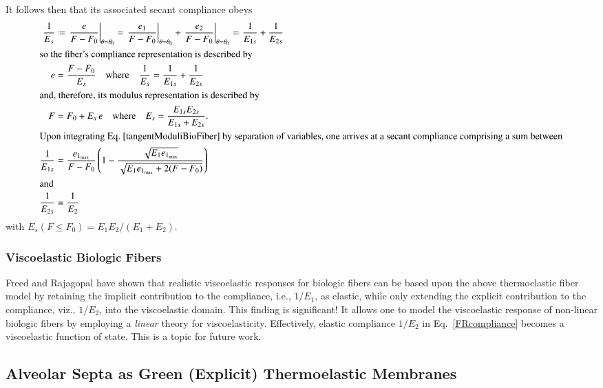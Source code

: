 It follows then that its associated secant compliance obeys
\begin{subequations}
    \label{secantFiberModulus}
    \begin{align}
    \frac{1}{E_s} & \defeq 
    \left. \frac{e}{F-F_0} \right|_{\theta = \theta_0} = 
    \left. \frac{e_1}{F-F_0} \right|_{\theta = \theta_0} + 
    \left. \frac{e_2}{F-F_0} \right|_{\theta = \theta_0} \eqdef 
    \frac{1}{E_{1s}} + \frac{1}{E_{2s}} \\
    \intertext{so the fiber's compliance representation is described by}
    e & = \frac{F - F_0}{E_s} 
    \quad \text{where} \quad
    \frac{1}{E_s} = \frac{1}{E_{1s}} + \frac{1}{E_{2s}} \\
    \intertext{and, therefore, its modulus representation is described by}
    F & = F_0 + E_s \, e
    \quad \text{where} \quad
    E_s = \frac{E_{1s} E_{2s}}{E_{1s} + E_{2s}} . \\
    \intertext{Upon integrating Eq.~\ref{tangentModuliBioFiber} by separation of variables, one arrives at a secant compliance comprising a sum between}
    \frac{1}{E_{1s}} & = \frac{e_{1_{\max}}}{F-F_0} \left( 1 - 
    \frac{\sqrt{E_1 e_{1_{\max}}}}
    {\sqrt{E_1 e_{1_{\max}} + 2(F-F_0)}} \right)  \\
    \intertext{and}
    \frac{1}{E_{2s}} & = \frac{1}{E_2}
    \end{align}
\end{subequations}
with $E_s(F \! \leq \! F_0) = E_1 E_2 / (E_1 + E_2)$. 

\subsubsection{Viscoelastic Biologic Fibers}

Freed and Rajagopal \cite{FreedRajagopal16a} have shown that realistic visco\-elastic responses for biologic fibers can be based upon the above thermo\-elastic fiber model by retaining the implicit contribution to the compliance, i.e., $1/E_1$, as elastic, while only extending the explicit contribution to the compliance, viz., $1/E_2$, into the visco\-elastic domain.  This finding is significant!  It allows one to model the visco\-elastic response of non-linear biologic fibers by employing a \textit{linear\/} theory for visco\-elasticity.  Effectively, elastic compliance $1/E_2$ in Eq.~\ref{FRcompliance} becomes a visco\-elastic function of state.  This is a topic for future work.

\subsection{Alveolar Septa as Green (Explicit) Thermoelastic Membranes}

